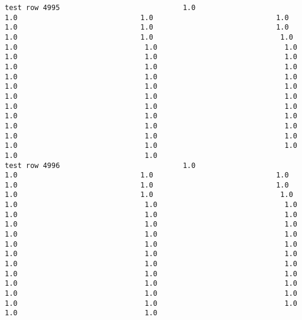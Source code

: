 \documentclass[11pt]{article}
\begin{document}
\begin{verbatim}
test row 4995                             1.0                             1.0                             1.0                             1.0                             1.0                             1.0                             1.0                             1.0                             1.0                              1.0                              1.0                              1.0                              1.0                              1.0                              1.0                              1.0                              1.0                              1.0                              1.0                              1.0                              1.0                              1.0                              1.0                              1.0                              1.0                              1.0                              1.0                              1.0                              1.0                              1.0                              1.0                              1.0                              1.0                              1.0                              1.0                              1.0                              1.0                              1.0                              1.0                              1.0                              1.0                              1.0                              1.0                              1.0                              1.0
test row 4996                             1.0                             1.0                             1.0                             1.0                             1.0                             1.0                             1.0                             1.0                             1.0                              1.0                              1.0                              1.0                              1.0                              1.0                              1.0                              1.0                              1.0                              1.0                              1.0                              1.0                              1.0                              1.0                              1.0                              1.0                              1.0                              1.0                              1.0                              1.0                              1.0                              1.0                              1.0                              1.0                              1.0                              1.0                              1.0                              1.0                              1.0                              1.0                              1.0                              1.0                              1.0                              1.0                              1.0                              1.0                              1.0

\end{verbatim}
\end{document}

